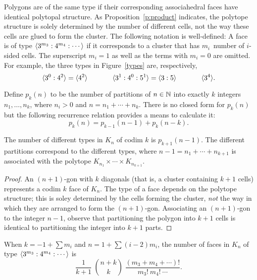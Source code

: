 \documentclass[10pt]{amsart}
\begin{document}
Polygons are of the same type if their corresponding associahedral faces have identical polytopal structure. As Proposition~\ref{p:product} indicates, the polytope structure is solely determined by the number of different cells, not the way these cells are glued to form the cluster. The following notation is well-defined:  A face is of type ${\langle} 3^{m_3} : 4^{m_4} : \cdots {\rangle}$ if it corresponds to a cluster that has $m_i$~number of $i$-sided cells.  The superscript $m_i = 1$ as well as the terms with $m_i = 0$ are omitted. For example, the three types in Figure~\ref{types} are, respectively, $${\langle} 3^0 : 4^2 {\rangle} = {\langle} 4^2 {\rangle} \hspace{.5in} {\langle} 3^1 : 4^0 : 5^1 {\rangle} = {\langle} 3 : 5 {\rangle} \hspace{.5in} {\langle} 3^4 {\rangle}.$$

Define $p_k(n)$ to be the number of partitions of $n \in {\mathbb N}$ into exactly $k$ integers $n_1, \ldots, n_k$, where $n_i > 0$ and $n = n_1 + \cdots + n_k$.  There is no closed form for $p_k(n)$ but the following recurrence relation provides a means to calculate it:
\begin{equation}
p_k(n) = p_{k-1}(n-1) + p_k(n-k).
\label{e:part}
\end{equation}

\begin{thm} 
The number of different types in $K_n$ of codim $k$ is $p_{k+1}(n-1)$. The different partitions correspond to the different types, where $n-1 = n_1 + \cdots + n_{k+1}$ is associated with the polytope $K_{n_1} \times \cdots \times K_{n_{k+1}}$.
\end{thm}

\begin{proof}
An $(n+1)$-gon with $k$ diagonals (that is, a cluster containing $k+1$ cells) represents a codim $k$ face of $K_n$. The type of a face depends on the polytope structure; this is soley determined by the cells forming the cluster, {\em not} the way in which they are arranged to form the $(n+1)$-gon. Associating an $(n+1)$-gon to the integer $n-1$, observe that partitioning the polygon into $k+1$ cells is identical to partitioning the integer into $k+1$ parts.
\end{proof}

\begin{thm} [Solution to {\em P3}\,]
When $k = -1 + \sum m_i$ and $n = 1 + \sum (i-2)m_i$, the number of faces in $K_n$ of type ${\langle} 3^{m_3} : 4^{m_4} : \cdots {\rangle}$ is 
$$\frac{1}{k+1} \; \binom{n+k}{k} \; \frac{(m_3 + m_4 + \cdots)!}{m_3! \ m_4! \ \cdots}.$$
\end{thm}
\end{document}
